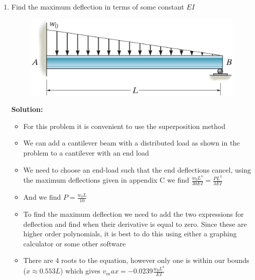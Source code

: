 \documentclass[12pt, oneside]{article}
\begin{document}
\begin{enumerate}
	\item %
		Find the maximum deflection in terms of some constant $EI$
		\begin{figure}[H]
			\centering
			\includegraphics[width=0.6\linewidth]{12-106}
		\end{figure}
			\textbf{Solution:}
			\begin{itemize}
				\item For this problem it is convenient to use the superposition method
				\item We can add a cantilever beam with a distributed load as shown in the problem to a cantilever with an end load
				\item We need to choose an end-load such that the end deflections cancel, using the maximum deflections given in appendix C we find $\frac{w_0 L^4}{30 EI} = \frac{PL^3}{3EI}$
				\item And we find $P = \frac{w_0 L}{10}$
				\item To find the maximum deflection we need to add the two expressions for deflection and find when their derivative is equal to zero. Since these are higher order polynomials, it is best to do this using either a graphing calculator or some other software
				\item There are 4 roots to the equation, however only one is within our bounds ($x \approx 0.553 L$) which gives $v_max = -0.0239 \frac{w_0L^4}{EI}$
			\end{itemize}


\end{enumerate}
\end{document}
